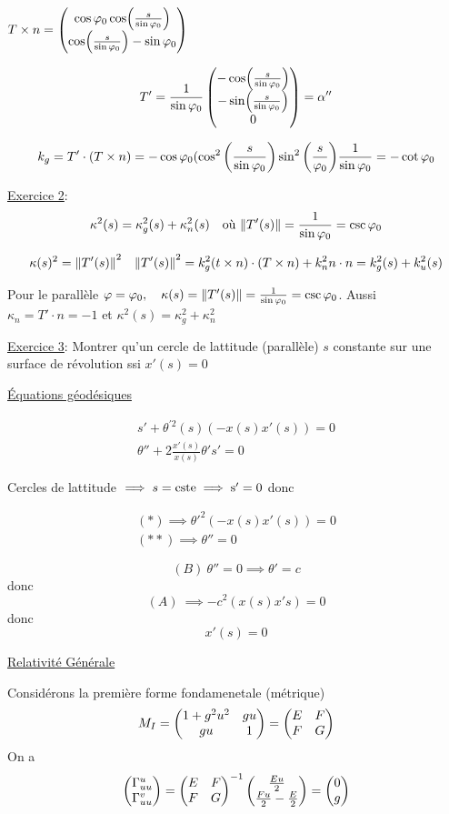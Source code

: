 $T \times n = \begin{pmatrix} \cos\varphi_{0} \cos(\frac{s}{\sin\varphi_{0}} )\\\cos( \frac{s}{\sin\varphi_0}) -\sin\varphi_0  \end{pmatrix}$ 

$$T' = \frac{1}{\sin\varphi_0} \begin{pmatrix} -\cos(\frac{s}{\sin\varphi_0}) \\ -\sin(\frac{s}{\sin\varphi_0}) \\ 0 \end{pmatrix}  = \alpha''$$ 

$$k_g = T' \cdot ( T \times n ) = -\cos \varphi_0 (\cos^2\qty(\frac{s}{\sin\varphi_0}) \sin^2\qty(\frac{s}{\varphi_0} ) \frac{1}{\sin\varphi_0} = -\cot\varphi_0 $$ 

\underline{Exercice 2}: $$\kappa^2(s) = \kappa_g^2(s)+ \kappa_n^2 (s) \quad \text{où } \norm{T'(s)} = \frac{1}{\sin\varphi_0} =\csc\varphi_0 $$  

$$\kappa (s)^2 = \norm{T'(s)}^2 \quad \norm{T'(s)}^2 = k_g^2 (t \times n) \cdot ( T \times n) + k_n^2 n \cdot n = k_g^2 (s) + k_u^2(s) $$ 

Pour le parallèle $\varphi = \varphi_0 , \quad \kappa(s) = \norm{T'(s)} = \frac{1}{\sin\varphi_0} =\csc\varphi_0 $. Aussi $\kappa_n = T' \cdot n = -1$ et $\kappa^2(s) = \kappa_g^2 + \kappa_n^2$  


\underline{Exercice 3}: Montrer qu'un cercle de lattitude (parallèle) $s$ constante sur une surface de révolution ssi $x'(s) = 0$  

\underline{Équations géodésiques} 

\begin{align}
	s' +\theta^{\prime2}(s)(-x(s)x'(s)) = 0 \tag{*} \\
	\theta'' + 2 \frac{x'(s)}{x(s)} \theta' s' =0 \tag{**}
\end{align} 

Cercles de lattitude $\implies s= \rm{cste} \implies s' =0 $ donc

\begin{align}
	(*) \implies \theta'^2(-x(s)x'(s)) = 0 \tag{A}\\
	(**) \implies \theta'' = 0 \tag{B}
\end{align}

$$(B) \ \theta'' = 0 \implies \theta'=c$$
donc
$$(A)\ \implies  -c^2(x(s)x's) = 0$$
donc $$x'(s) = 0$$ 


\underline{Relativité Générale} 

Considérons la première forme fondamenetale (métrique) $$M_I = \begin{pmatrix} 1 +g^2u^2& gu \\ gu &1 \end{pmatrix} = \begin{pmatrix} E &F \\F &G \end{pmatrix}$$ On a $$\begin{pmatrix} \Gamma_{uu}^u \\ \Gamma_{uu}^v \end{pmatrix} = \begin{pmatrix} E &F \\F &G \end{pmatrix}^{-1} \begin{pmatrix} \frac{Eu}{2} \\ \frac{Fu}{2} -\frac{E}{2}  \end{pmatrix} = \begin{pmatrix} 0\\g \end{pmatrix}$$   

